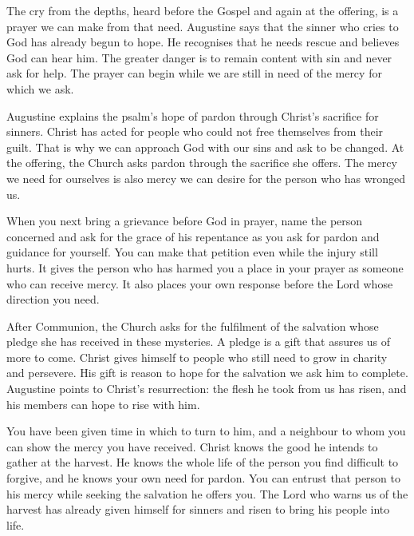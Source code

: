 The cry from the depths, heard before the Gospel and again at the
offering, is a prayer we can make from that need. Augustine says
that the sinner who cries to God has already begun to hope. He
recognises that he needs rescue and believes God can hear him.
The greater danger is to remain content with sin and never ask
for help. The prayer can begin while we are still in need of the
mercy for which we ask.

Augustine explains the psalm's hope of pardon through Christ's
sacrifice for sinners. Christ has acted for people who could not
free themselves from their guilt. That is why we can approach God
with our sins and ask to be changed. At the offering, the Church
asks pardon through the sacrifice she offers. The mercy we need
for ourselves is also mercy we can desire for the person who has
wronged us.

When you next bring a grievance before God in prayer, name the
person concerned and ask for the grace of his repentance as you
ask for pardon and guidance for yourself. You can make that
petition even while the injury still hurts. It gives the person
who has harmed you a place in your prayer as someone who can
receive mercy. It also places your own response before the Lord
whose direction you need.

After Communion, the Church asks for the fulfilment of the salvation
whose pledge she has received in these mysteries. A pledge is a gift
that assures us of more to come. Christ gives himself to people who
still need to grow in charity and persevere. His gift is reason to
hope for the salvation we ask him to complete. Augustine points to
Christ's resurrection: the flesh he took from us has risen, and
his members can hope to rise with him.

You have been given time in which to turn to him, and a neighbour
to whom you can show the mercy you have received. Christ knows
the good he intends to gather at the harvest. He knows the whole
life of the person you find difficult to forgive, and he knows
your own need for pardon. You can entrust that person to his
mercy while seeking the salvation he offers you. The Lord who
warns us of the harvest has already given himself for sinners
and risen to bring his people into life.
